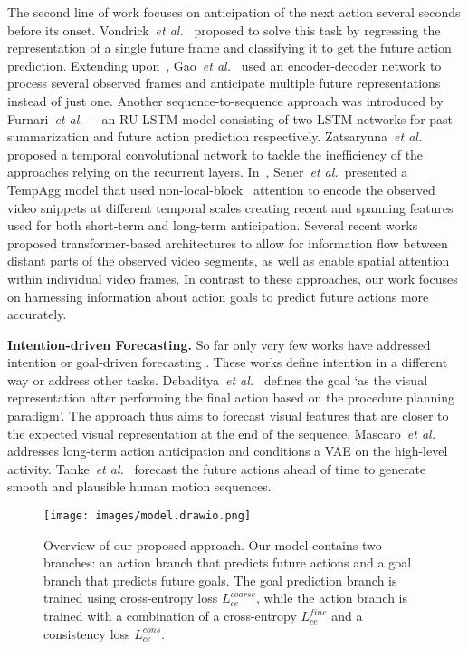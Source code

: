 \documentclass{article}
\newcommand{\etal}[1]{\textit{et al}\onedot}
\def\etal{\emph{et al.}}
\begin{document}
The second line of work focuses on anticipation of the next action several seconds before its onset. Vondrick~\etal~\cite{Vondrick_2016_CVPR} proposed to solve this task by regressing the representation of a single future frame and classifying it to get the future action prediction. Extending upon~\cite{Vondrick_2016_CVPR}, Gao~\etal~\cite{Gao_2017_BMVC} used an encoder-decoder network to process several observed frames and anticipate multiple future representations instead of just one. Another sequence-to-sequence approach was introduced by Furnari~\etal~\cite{furnari2020rulstm} - an RU-LSTM model consisting of two LSTM networks for past summarization and future action prediction respectively. Zatsarynna~\etal~\cite{zatsarynna2021MMTCN} proposed a temporal convolutional network to tackle the inefficiency of the approaches relying on the recurrent layers. In~\cite{sener2020temporal}, Sener~\etal\ presented a TempAgg model that used non-local-block~\cite{Wang2017NonlocalNN} attention to encode the observed video snippets at different temporal scales creating recent and spanning features used for both short-term and long-term anticipation. Several recent works~\cite{zhao2022testra, girdhar2021anticipative, memvit2022} proposed transformer-based architectures to allow for information flow between distant parts of the observed video segments, as well as enable spatial attention within individual video frames. In contrast to these approaches, our work focuses on harnessing information about action goals to predict future actions more accurately.

\textbf{Intention-driven Forecasting.} So far only very few works have addressed intention or goal-driven forecasting \cite{tanke2021intention,Mascaro_2023_WACV,debaditya2022latent}. These works define intention in a different way or address other tasks. Debaditya~\etal~\cite{debaditya2022latent} defines the goal `as the visual representation after performing the final action based on the procedure planning paradigm'. The approach thus aims to forecast visual features that are closer to the expected visual representation at the end of the sequence. Mascaro~\etal~\cite{Mascaro_2023_WACV} addresses long-term action anticipation and conditions a VAE on the high-level activity. Tanke~\etal~\cite{tanke2021intention} forecast the future actions ahead of time to generate smooth and plausible human motion sequences. 





\begin{figure}[h!]
\begin{minipage}[b]{0.5\textwidth}
  \centering
  \texttt{[image: images/model.drawio.png]}
\end{minipage}
\caption{\small Overview of our proposed approach. Our model contains two branches: an action branch that predicts future actions and a goal branch that predicts future goals. The goal prediction branch is trained using cross-entropy loss $L_{ce}^{coarse}$, while the action branch is trained with a combination of a cross-entropy $L_{ce}^{fine}$ and a consistency loss $L_{ce}^{cons}$.}
\label{fig:model}
\vspace{-0.3cm}
\end{figure}
\end{document}
